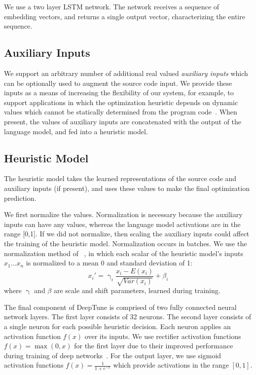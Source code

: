 We use a two layer LSTM network. The network receives a sequence of embedding vectors, and returns a single output vector, characterizing the entire sequence.


\subsection{Auxiliary Inputs}

We support an arbitrary number of additional real valued \emph{auxiliary inputs} which can be optionally used to augment the source code input. We provide these inputs as a means of increasing the flexibility of our system, for example, to support applications in which the optimization heuristic depends on dynamic values which cannot be statically determined from the program code~\cite{Ding2015,Stephenson2005}. When present, the values of auxiliary inputs are concatenated with the output of the language model, and fed into a heuristic model.


\subsection{Heuristic Model}

The heuristic model takes the learned representations of the source code and auxiliary inputs (if present), and uses these values to make the final optimization prediction.

We first normalize the values. Normalization is necessary because the auxiliary inputs can have any values, whereas the language model activations are in the range [0,1]. If we did not normalize, then scaling the auxiliary inputs could affect the training of the heuristic model. Normalization occurs in batches. We use the normalization method of ~\cite{Ioffe2015a}, in which each scalar of the heuristic model's inputs $x_1 \ldots x_n$ is normalized to a mean 0 and standard deviation of 1:
%
\begin{equation}
x_i' = \upgamma_i \frac{x_i - E(x_i)}{\sqrt{Var(x_i)}} + \beta_i
\end{equation}
%
where $\upgamma$ and $\beta$ are scale and shift parameters, learned during training.

The final component of DeepTune is comprised of two fully connected neural network layers. The first layer consists of 32 neurons. The second layer consists of a single neuron for each possible heuristic decision. Each neuron applies an activation function $f(x)$ over its inputs. We use rectifier activation functions $f(x) = \max(0, x)$ for the first layer due to their improved performance during training of deep networks~\cite{Nair2010}. For the output layer, we use sigmoid activation functions $f(x) = \frac{1}{1+e^{-x}}$ which provide activations in the range $[0,1]$.

